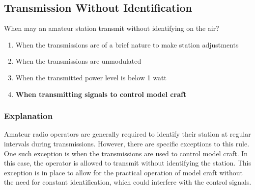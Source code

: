 \subsection{Transmission Without Identification}
\label{T1D11}

\begin{tcolorbox}[colback=gray!10!white,colframe=black!75!black,title=T1D11]
When may an amateur station transmit without identifying on the air?
\begin{enumerate}[label=\Alph*,noitemsep]
    \item When the transmissions are of a brief nature to make station adjustments
    \item When the transmissions are unmodulated
    \item When the transmitted power level is below 1 watt
    \item \textbf{When transmitting signals to control model craft}
\end{enumerate}
\end{tcolorbox}

\subsubsection*{Explanation}
Amateur radio operators are generally required to identify their station at regular intervals during transmissions. However, there are specific exceptions to this rule. One such exception is when the transmissions are used to control model craft. In this case, the operator is allowed to transmit without identifying the station. This exception is in place to allow for the practical operation of model craft without the need for constant identification, which could interfere with the control signals.